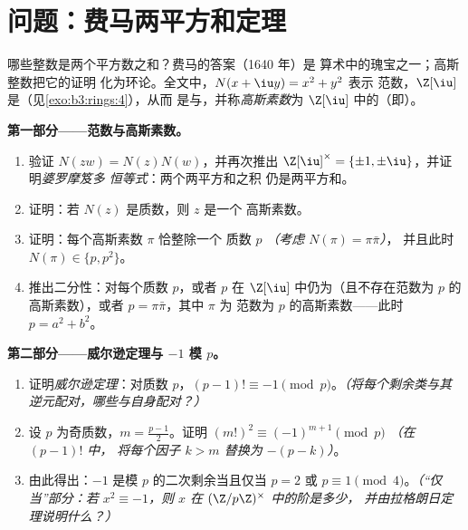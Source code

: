 \section{问题：费马两平方和定理}

\begin{problem}\label{pb:b3:rings:1}
哪些整数是两个平方数之和？费马的答案（1640 年）是
算术中的瑰宝之一；高斯整数把它的证明
化为环论。全文中，$N(x + \iu y) = x^2 + y^2$ 表示
范数，$\Z[\iu]$ 是（见\cref{exo:b3:rings:4}），从而
是与，并称\emph{高斯素数}为
$\Z[\iu]$ 中的（即）。

\medskip
\noindent\textbf{第一部分——范数与高斯素数。}
\begin{enumerate}
  \item 验证 $N(zw) = N(z)N(w)$，并再次推出 $\Z[\iu]^\times =
        \{\pm1, \pm\iu\}$，并证明\emph{婆罗摩笈多
        恒等式}：两个两平方和之积
        仍是两平方和。
  \item 证明：若 $N(z)$ 是质数，则 $z$ 是一个
        高斯素数。
  \item 证明：每个高斯素数 $\pi$ 恰整除一个
        质数 $p$ \emph{（考虑 $N(\pi) = \pi\bar\pi$）}，
        并且此时 $N(\pi) \in \{p, p^2\}$。
  \item 推出二分性：对每个质数 $p$，或者 $p$
        在 $\Z[\iu]$ 中仍为（且不存在范数为
        $p$ 的高斯素数），或者 $p = \pi\bar\pi$，其中 $\pi$ 为
        范数为 $p$ 的高斯素数——此时 $p = a^2 + b^2$。
\end{enumerate}

\medskip
\noindent\textbf{第二部分——威尔逊定理与 $-1$ 模
$p$。}
\begin{enumerate}[resume]
  \item 证明\emph{威尔逊定理}：对质数 $p$，$(p-1)!
        \equiv -1 \pmod p$。\emph{（将每个剩余类与其
        逆元配对，哪些与自身配对？）}
  \item 设 $p$ 为奇质数，$m = \frac{p-1}2$。证明
        $(m!)^2 \equiv (-1)^{m+1} \pmod p$ \emph{（在 $(p-1)!$ 中，
        将每个因子 $k > m$ 替换为 $-(p - k)$）}。
  \item 由此得出：$-1$ 是模 $p$ 的二次剩余当且仅当 $p = 2$ 或 $p
        \equiv 1 \pmod 4$。\emph{（“仅当”部分：若 $x^2
        \equiv -1$，则 $x$ 在 $(\Z/p\Z)^\times$ 中的阶是多少，
        并由拉格朗日定理说明什么？）}
\end{enumerate}


\end{problem}
